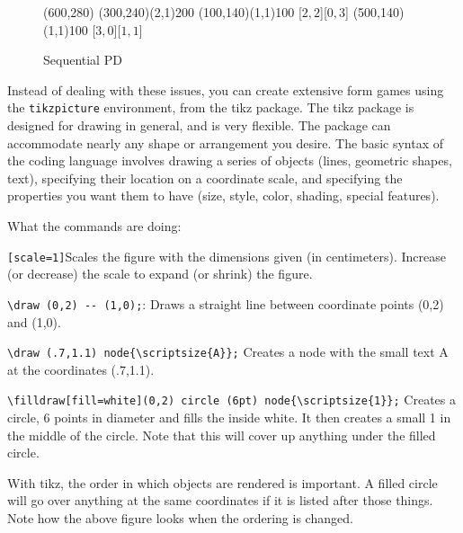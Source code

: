 \documentclass[10.5pt]{article}
\begin{document}
\begin{figure}[htb]
\hspace*{\fill}
\begin{egame}(600,280)
\putbranch(300,240)(2,1){200}
\putbranch(100,140)(1,1){100}
[$2,2$][$0,3$]
\putbranch(500,140)(1,1){100}
[$3,0$][$1,1$]
\end{egame}
\hspace*{\fill}
\caption[]{Sequential PD}
\end{figure}

Instead of dealing with these issues, you can create extensive form games using the \verb+tikzpicture+ environment, from the tikz package. The tikz package is designed for drawing in general, and is very flexible. The package can accommodate nearly any shape or arrangement you desire. The basic syntax of the coding language involves drawing a series of objects (lines, geometric shapes, text), specifying their location on a coordinate scale, and specifying the properties you want them to have (size, style, color, shading, special features). 


\begin{center}
\end{center}

What the commands are doing: \\

\begin{compactitem}
\item \verb+[scale=1]+Scales the figure with the dimensions given (in centimeters).  Increase (or decrease) the scale to expand (or shrink) the figure.
\item \verb+\draw (0,2) -- (1,0);+: Draws a straight line between coordinate points (0,2) and (1,0).
\item \verb+\draw (.7,1.1) node{\scriptsize{A}};+ Creates a node with the small text A at the coordinates (.7,1.1).
\item \verb+\filldraw[fill=white](0,2) circle (6pt) node{\scriptsize{1}};+ Creates a circle, 6 points in diameter and fills the inside white. It then creates a small 1 in the middle of the circle. Note that this will cover up anything under the filled circle. 
\end{compactitem}
\vspace{.5cm}
With tikz, the order in which objects are rendered is important. A filled circle will go over anything at the same coordinates if it is listed after those things. Note how the above figure looks when the ordering is changed.
\end{document}

